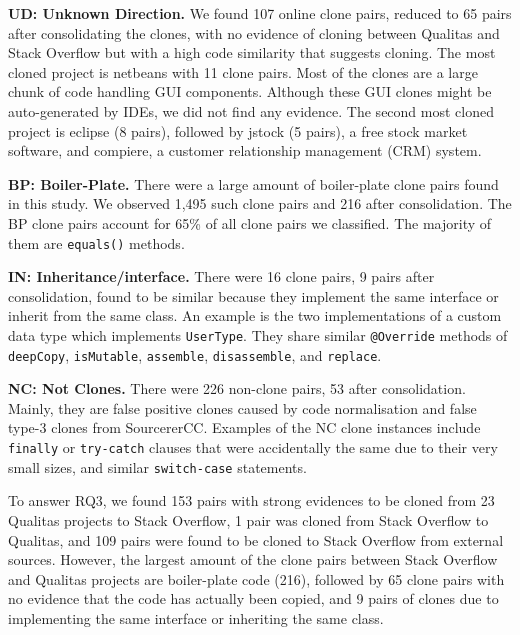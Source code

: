 \documentclass[10pt,journal,compsoc]{IEEEtran}
\newenvironment{boxquote}{\vspace{-1ex}\setlength{\FrameSep}{1\fboxsep}\begin{framed}\setlength{\parskip}{0.5\baselineskip}\setlength{\parindent}{0pt}}{\end{framed}}
\begin{document}

\textbf{UD: Unknown Direction.} We found 107 online clone pairs, reduced to 65
pairs after consolidating the clones, with no evidence of cloning between Qualitas
and Stack Overflow but with a high code similarity that suggests cloning. 
The most cloned project is \textsf{netbeans} with 11 clone pairs. Most of the
clones are a large chunk of code handling GUI components. Although these GUI
clones might be auto-generated by IDEs, we did not find any evidence. The second
most cloned project is \textsf{eclipse} (8 pairs), followed by
\textsf{jstock}  (5 pairs),
a free stock market software, and \textsf{compiere}, a customer
relationship management (CRM) system.

\textbf{BP: Boiler-Plate.} There were a large amount of boiler-plate clone pairs
found in this study. We observed 1,495 such clone pairs and 216 after
consolidation. The BP clone pairs account for 65\% of all clone pairs we
classified. The majority of them are {\small{\texttt{equals()}}} methods.

\textbf{IN: Inheritance/interface.} There were 16 clone pairs, 9 pairs after
consolidation, found to be similar because they implement the same interface or
inherit from the same class. An example is the two implementations of a
custom data type which implements {\small\texttt{UserType}}. They share similar
{\small\texttt{@Override}} methods of {\small\texttt{deepCopy}},
{\small\texttt{isMutable}}, {\small\texttt{assemble}},
{\small\texttt{disassemble}}, and {\small\texttt{replace}}.

\textbf{NC: Not Clones.} There were 226 non-clone
pairs, 53 after consolidation. Mainly, they are false positive clones caused by code
normalisation and false type-3 clones from SourcererCC. 
Examples of the NC clone instances include {\small\texttt{finally}} or
{\small\texttt{try-catch}} clauses that were accidentally the same due
to their very small sizes, and similar {\small\texttt{switch-case}}
statements.

\begin{boxquote}
To answer RQ3, we found 153 pairs with
strong evidences to be cloned from 23 Qualitas projects to Stack Overflow, 1 pair
was cloned from Stack Overflow to Qualitas, and
109 pairs were found to be cloned to Stack Overflow from external
sources. However, the largest amount of the clone pairs
between Stack Overflow and Qualitas projects are \linebreak boiler-plate code
(216), followed by 65 clone pairs with no evidence that the code has actually been copied,
and 9 pairs of clones due to implementing the same interface or inheriting the same class.
\end{boxquote}
\end{document}

